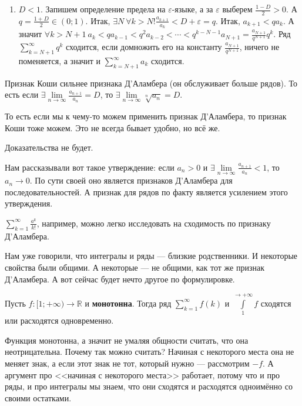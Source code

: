 \documentclass{article}
\begin{document}
\begin{itemize}
\begin{Proof}
\begin{enumerate}
                \item $D<1$. Запишем определение предела на $\varepsilon$-языке, а за $\varepsilon$ выберем $\frac{1-D}2>0$. А $q=\frac{1+D}2\in(0;1)$. Итак, $\exists N~\forall k>N!\frac{a_{k+1}}{a_k}<D+\varepsilon=q$. Итак, $a_{k+1}<qa_k$. А значит $\forall k>N+1~a_k<qa_{k-1}<q^2a_{k-2}<\cdots<q^{k-N-1}a_{N+1}=\frac{a_{N+1}}{q^{N+1}}q^k$. Ряд $\sum\limits_{k=N+1}^\infty q^k$ сходится, если домножить его на константу $\frac{a_{N+1}}{q^{N+1}}$, ничего не поменяется, а значит и $\sum\limits_{k=N+1}^\infty a_k$ сходится.
            \end{enumerate}
        \end{Proof}
        \thm Признак Коши сильнее признака Д'Аламбера (он обслуживает больше рядов). То есть если $\exists\lim\limits_{n\to\infty}\frac{a_{n+1}}{a_n}=D$, то $\exists\lim\limits_{n\to\infty}\sqrt[n]{a_n}=D$.
        \begin{Comment}
            То есть если мы к чему-то можем применить признак Д'Аламбера, то признак Коши тоже можем. Это не всегда бывает удобно, но всё же.
        \end{Comment}
        \begin{Proof}
            Доказательства не будет.
        \end{Proof}
        \begin{Comment}
            Нам рассказывали вот такое утверждение: если $a_n>0$ и $\exists\lim\limits_{n\to\infty}\frac{a_{n+1}}{a_n}<1$, то $a_n\rightarrow0$. По сути своей оно является признаков Д'Аламбера для последовательностей. А признак для рядов по факту является усилением этого утверждения.
        \end{Comment}
        \begin{Example}
            $\sum\limits_{k=1}^\infty \frac{a^k}{k!}$, например, можно легко исследовать на сходимость по признаку Д'Аламбера.
        \end{Example}
        \begin{Comment}
            Нам уже говорили, что интегралы и ряды --- близкие родственники. И некоторые свойства были общими. А некоторые --- не общими, как тот же признак Д'Аламбера. А вот сейчас будет нечто другое по формулировке.
        \end{Comment}
        \thm Пусть $f\colon[1;+\infty)\to\mathbb R$ и \textbf{монотонна}. Тогда ряд $\sum\limits_{k=1}^\infty f(k)$ и $\int\limits_1^{\to+\infty}f$ сходятся или расходятся одновременно.
        \begin{Proof}
            Функция монотонна, а значит не умаляя общности считать, что она неотрицательна. Почему так можно считать? Начиная с некоторого места она не меняет знак, а если этот знак не тот, который нужно --- рассмотрим $-f$. А аргумент про <<начиная с некоторого места>> работает, потому что и про ряды, и про интегралы мы знаем, что они сходятся и расходятся одноимённо со своими остатками.\\

\end{Proof}
\end{itemize}
\end{document}
